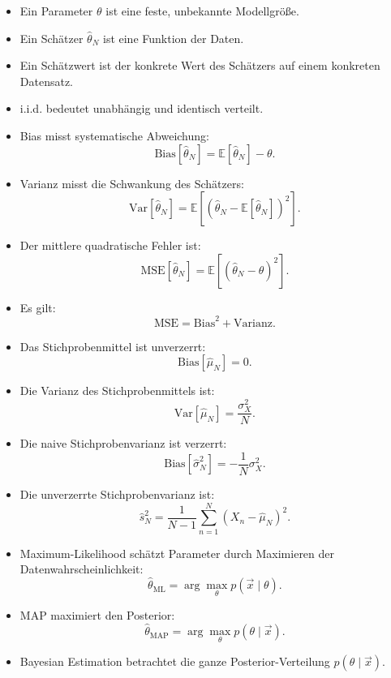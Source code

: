\begin{itemize}
    \item Ein Parameter \(\theta\) ist eine feste, unbekannte Modellgröße.
    \item Ein Schätzer \(\hat{\theta}_N\) ist eine Funktion der Daten.
    \item Ein Schätzwert ist der konkrete Wert des Schätzers auf einem konkreten Datensatz.
    \item i.i.d. bedeutet unabhängig und identisch verteilt.
    \item Bias misst systematische Abweichung:
    \[
        \mathrm{Bias}[\hat{\theta}_N]
        =
        \mathbb{E}[\hat{\theta}_N]-\theta.
    \]
    \item Varianz misst die Schwankung des Schätzers:
    \[
        \mathrm{Var}[\hat{\theta}_N]
        =
        \mathbb{E}\left[
            \left(
                \hat{\theta}_N
                -
                \mathbb{E}[\hat{\theta}_N]
            \right)^2
        \right].
    \]
    \item Der mittlere quadratische Fehler ist:
    \[
        \mathrm{MSE}[\hat{\theta}_N]
        =
        \mathbb{E}\left[
            (\hat{\theta}_N-\theta)^2
        \right].
    \]
    \item Es gilt:
    \[
        \mathrm{MSE}
        =
        \mathrm{Bias}^2
        +
        \mathrm{Varianz}.
    \]
    \item Das Stichprobenmittel ist unverzerrt:
    \[
        \mathrm{Bias}[\hat{\mu}_N]=0.
    \]
    \item Die Varianz des Stichprobenmittels ist:
    \[
        \mathrm{Var}[\hat{\mu}_N]
        =
        \frac{\sigma_X^2}{N}.
    \]
    \item Die naive Stichprobenvarianz ist verzerrt:
    \[
        \mathrm{Bias}[\hat{\sigma}^2_N]
        =
        -\frac{1}{N}\sigma_X^2.
    \]
    \item Die unverzerrte Stichprobenvarianz ist:
    \[
        \hat{s}^2_N
        =
        \frac{1}{N-1}
        \sum_{n=1}^{N}
        (X_n-\hat{\mu}_N)^2.
    \]
    \item Maximum-Likelihood schätzt Parameter durch Maximieren der Datenwahrscheinlichkeit:
    \[
        \hat{\theta}_{\mathrm{ML}}
        =
        \arg\max_{\theta}
        p(\vec{x}\mid\theta).
    \]
    \item MAP maximiert den Posterior:
    \[
        \hat{\theta}_{\mathrm{MAP}}
        =
        \arg\max_{\theta}
        p(\theta\mid\vec{x}).
    \]
    \item Bayesian Estimation betrachtet die ganze Posterior-Verteilung \(p(\theta\mid\vec{x})\).
\end{itemize}

